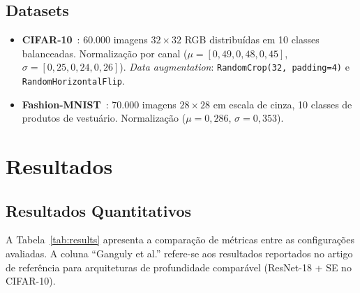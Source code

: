 \documentclass[runningheads]{llncs}
\begin{document}
\subsection{Datasets}

\begin{itemize}
  \item \textbf{CIFAR-10}~\cite{ref_cifar10}: 60.000 imagens
    $32 \times 32$ RGB distribuídas em 10 classes balanceadas.
    Normalização por canal
    ($\mu = [0{,}49, 0{,}48, 0{,}45]$,
     $\sigma = [0{,}25, 0{,}24, 0{,}26]$).
    \textit{Data augmentation}: \texttt{RandomCrop(32, padding=4)} e
    \texttt{RandomHorizontalFlip}.
  \item \textbf{Fashion-MNIST}~\cite{ref_fashion}: 70.000 imagens
    $28 \times 28$ em escala de cinza, 10 classes de produtos de vestuário.
    Normalização ($\mu = 0{,}286$, $\sigma = 0{,}353$).
\end{itemize}

\section{Resultados}

\subsection{Resultados Quantitativos}

A Tabela~\ref{tab:results} apresenta a comparação de métricas entre as
configurações avaliadas. A coluna ``Ganguly et al.'' refere-se aos
resultados reportados no artigo de referência para arquiteturas de
profundidade comparável (ResNet-18 + SE no CIFAR-10).
\end{document}
